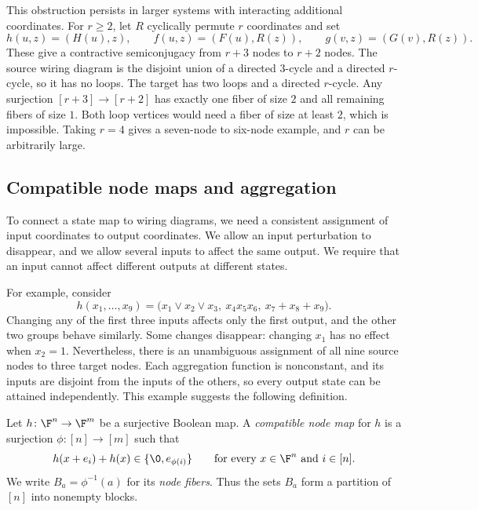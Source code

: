 \begin{example}
    This obstruction persists in larger systems with interacting additional coordinates. For $r\ge2$, let $R$ cyclically permute $r$ coordinates and set
    \[
        h(u,z)=(H(u),z),\qquad
        f(u,z)=(F(u),R(z)),\qquad
        g(v,z)=(G(v),R(z)).
    \]
    These give a contractive semiconjugacy from $r+3$ nodes to $r+2$ nodes. The source wiring diagram is the disjoint union of a directed $3$-cycle and a directed $r$-cycle, so it has no loops. The target has two loops and a directed $r$-cycle. Any surjection $[r+3]\to[r+2]$ has exactly one fiber of size $2$ and all remaining fibers of size $1$. Both loop vertices would need a fiber of size at least $2$, which is impossible. Taking $r=4$ gives a seven-node to six-node example, and $r$ can be arbitrarily large.
\end{example}

\subsection{Compatible node maps and aggregation}

To connect a state map to wiring diagrams, we need a consistent assignment of input coordinates to output coordinates. We allow an input perturbation to disappear, and we allow several inputs to affect the same output. We require that an input cannot affect different outputs at different states.

For example, consider
\[
    h(x_1,\dots,x_9)
    =\bigl(x_1\vee x_2\vee x_3,\ x_4x_5x_6,\ x_7+x_8+x_9\bigr).
\]
Changing any of the first three inputs affects only the first output, and the other two groups behave similarly. Some changes disappear: changing $x_1$ has no effect when $x_2=1$. Nevertheless, there is an unambiguous assignment of all nine source nodes to three target nodes. Each aggregation function is nonconstant, and its inputs are disjoint from the inputs of the others, so every output state can be attained independently. This example suggests the following definition.

\begin{definition}\label{def:compatible-node-map}
    Let $h\colon\F^n\to\F^m$ be a surjective Boolean map. A \emph{compatible node map} for $h$ is a surjection $\phi\colon[n]\to[m]$ such that
    \begin{equation}\label{eq:compatible-node-directions}
        h(x+e_i)+h(x)\in\{\0,e_{\phi(i)}\}
        \qquad\text{for every }x\in\F^n\text{ and }i\in[n].
    \end{equation}
    We write $B_a=\phi^{-1}(a)$ for its \emph{node fibers}. Thus the sets $B_a$ form a partition of $[n]$ into nonempty blocks.
\end{definition}

